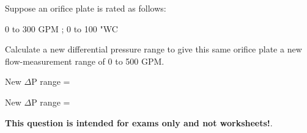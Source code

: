 

Suppose an orifice plate is rated as follows:

\vskip 10pt

\hskip 40pt 0 to 300 GPM ; 0 to 100 "WC

\vskip 10pt

Calculate a new differential pressure range to give this same orifice plate a new flow-measurement range of 0 to 500 GPM.

\vskip 10pt

New $\Delta$P range = \underbar{\hskip 50pt}







New $\Delta$P range = 







{\bf This question is intended for exams only and not worksheets!}.



